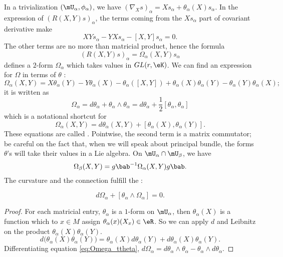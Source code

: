 In a trivialization $(\mU_{\alpha},\phi_{\alpha})$, we have $(\nabla_Xs)_{\alpha}=Xs_{\alpha}+\theta_{\alpha}(X)s_{\alpha}$. In the expression of $(R(X,Y)s)_{\alpha}$, the terms coming from the $Xs_{\alpha}$ part of covariant derivative make
\[
  XYs_{\alpha}-YXs_{\alpha}-[X,Y]s_{\alpha}=0.
\]
The other terms are no more than matricial product, hence the formula
\begin{equation}
  (R(X,Y)s)_{\alpha}=\Omega_{\alpha}(X,Y)s_{\alpha}
\end{equation}
 defines a $2$-form $\Omega_{\alpha}$ which takes values in $GL(r,\eK)$. We can find an expression for $\Omega$ in terms of $\theta$ :
\[
  \Omega_{\alpha}(X,Y)=X\theta_{\alpha}(Y)-Y\theta_{\alpha}(X)-\theta_{\alpha}([X,Y])+\theta_{\alpha}(X)\theta_{\alpha}(Y)-\theta_{\alpha}(Y)\theta_{\alpha}(X);
\]
it is written as
\begin{equation}\label{eq:Omega_ttheta}
\Omega_{\alpha}=d\theta_{\alpha}+\theta_{\alpha}\wedge\theta_{\alpha}=d\theta_{\alpha}+\frac{1}{2}[\theta_{\alpha},\theta_{\alpha}]
\end{equation}
which is a notational shortcut for
\begin{equation}		\label{EaCurvdVVsq}
  \Omega_{\alpha}(X,Y)=d\theta_{\alpha}(X,Y)+[\theta_{\alpha}(X),\theta_{\alpha}(Y)].
\end{equation}
These equations are called . Pointwise, the second term is a matrix commutator; be careful on the fact that, when we will speak about principal bundle, the forms $\theta$'s will take their values in a Lie algebra. On $\mU_{\alpha}\cap\mU_{\beta}$, we have
\[
  \Omega_{\beta}(X,Y)=g\bab^{-1}\Omega_{\alpha}(X,Y)g\bab.
\]
The curvature and the connection fulfill the  :

\begin{lemma}
  \[
     d\Omega_{\alpha}+[\theta_{\alpha}\wedge\Omega_{\alpha}]=0.
  \]
\end{lemma}

\begin{proof}
For each matricial entry, $\theta_{\alpha}$ is a $1$-form on $\mU_{\alpha}$, then $\theta_{\alpha}(X)$ is a function which to $x\in M$ assign $\theta_{\alpha}(x)(X_x)\in\eR$. So we can apply $d$ and Leibnitz on the product $\theta_{\alpha}(X)\theta_{\alpha}(Y)$.
\[
 d\big(  \theta_{\alpha}(X)\theta_{\alpha}(Y)  \big)=\theta_{\alpha}(X)d\theta_{\alpha}(Y)+d\theta_{\alpha}(X)\theta_{\alpha}(Y).
\]
Differentiating equation \eqref{eq:Omega_ttheta}, $d\Omega_{\alpha}=d\theta_{\alpha}\wedge\theta_{\alpha}-\theta_{\alpha}\wedge d\theta_{\alpha}$. 
\end{proof}

